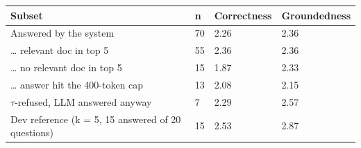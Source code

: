\begin{tabular}{llll}
\hline
Subset & n & Correctness & Groundedness \\
\hline
Answered by the system & 70 & 2.26 & 2.36 \\
\ldots{} relevant doc in top 5 & 55 & 2.36 & 2.36 \\
\ldots{} no relevant doc in top 5 & 15 & 1.87 & 2.33 \\
\ldots{} answer hit the 400-token cap & 13 & 2.08 & 2.15 \\
$\tau$-refused, LLM answered anyway & 7 & 2.29 & 2.57 \\
Dev reference (k = 5, 15 answered of 20 questions) & 15 & 2.53 & 2.87 \\
\hline
\end{tabular}
